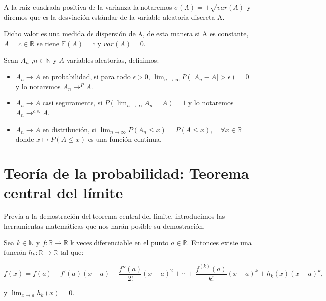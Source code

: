\documentclass[../proyecto.tex]{memoir}
\begin{document}
\begin{defi}
A la raíz cuadrada positiva de la varianza la notaremos $\sigma(A)=+\sqrt{var(A)}$ y diremos que es la desviación estándar de la variable aleatoria discreta A. 
\end{defi}

Dicho valor es una medida de dispersión de A, de esta manera si A es constante, $A = c\in \mathds{R}$ se tiene $\mathds{E}(A)=c$ y $var(A) = 0$.


\begin{defi}

Sean ${A_n}$ ,$n\in \mathds{N}$ y $A$ variables aleatorias, definimos:

\begin{itemize}

\item $A_n \to A$ en probabilidad, si para todo $\epsilon > 0$, $\lim_{n\to\infty} P( |A_n-A|> \epsilon ) = 0$ y lo notaremos $A_n \to^{P} A$.

\item $A_n \to A$ casi seguramente, si $P(\lim_{n\to\infty} A_n=A) = 1$ y lo notaremos $A_n \to^{c.s.} A$.

\item $A_n \to A$ en distribución, si $\lim_{n \to \infty} P(A_n \leq x) = P(A \leq x),\quad \forall x \in \mathds{R}$ donde $x\mapsto P(A \leq x)$ es una función continua.

\end{itemize}
\end{defi}





\section{Teoría de la probabilidad: Teorema central del límite}

Previa a la demostración del teorema central del límite, introducimos las herramientas matemáticas que nos harán posible su demostración.

\begin{teorema}

Sea $k \in \mathds{N}$ y $f: \mathds{R} \to \mathds{R}$ k veces diferenciable en el punto $a \in \mathds{R}$. Entonces existe una función $h_k: \mathds{R} \to \mathds{R}$ tal que:

$$
f(x)=f(a)+f'(a)(x-a)+\frac{f''(a)}{2!}(x-a)^2+\dotsb+\frac{f^{(k)}(a)}{k!}(x-a)^k + h_k(x)(x-a)^k,
$$

y $\lim_{x\to a} h_k(x) = 0$.
\end{teorema}
 
\end{document}
